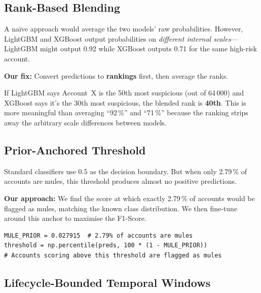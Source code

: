 \documentclass[11pt, a4paper]{article}
\begin{document}
\subsection{Rank-Based Blending}

A na\"ive approach would average the two models' raw probabilities. However, LightGBM and
XGBoost output probabilities on \emph{different internal scales}---LightGBM might output
0.92 while XGBoost outputs 0.71 for the same high-risk account.

\textbf{Our fix:} Convert predictions to \textbf{rankings} first, then average the ranks.

\begin{insightbox}
If LightGBM says Account~X is the 50th most suspicious (out of 64\,000) and XGBoost says
it's the 30th most suspicious, the blended rank is \textbf{40th}. This is more meaningful
than averaging ``92\,\%'' and ``71\,\%'' because the ranking strips away the arbitrary scale
differences between models.
\end{insightbox}

\subsection{Prior-Anchored Threshold}

Standard classifiers use 0.5 as the decision boundary. But when only 2.79\,\% of accounts
are mules, this threshold produces almost no positive predictions.

\textbf{Our approach:}\quad
We find the score at which exactly 2.79\,\% of accounts would be flagged as mules, matching
the known class distribution. We then fine-tune around this anchor to maximise the F1-Score.

\begin{lstlisting}[caption={Prior-anchored threshold (from \texttt{step9v11\_defensive\_submission.py}).}]
MULE_PRIOR = 0.027915  # 2.79% of accounts are mules
threshold = np.percentile(preds, 100 * (1 - MULE_PRIOR))
# Accounts scoring above this threshold are flagged as mules
\end{lstlisting}

\subsection{Lifecycle-Bounded Temporal Windows}
\end{document}
